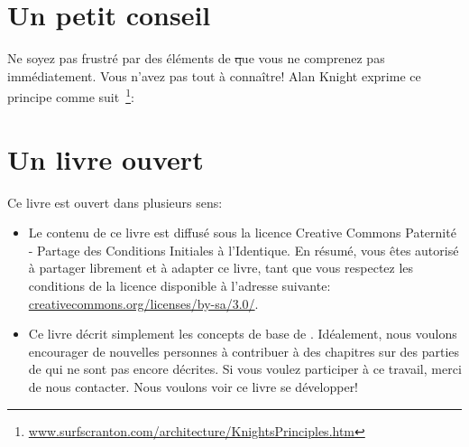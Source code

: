 \documentclass[a4paper,10pt,twoside]{book}
\begin{document}
\ifluluelse{}{\newpage} %
\section*{Un petit conseil}


Ne soyez pas frustr\'e par des \'el\'ements de \st que vous ne comprenez pas imm\'ediatement.
Vous n'avez pas tout \`a conna\^itre!
Alan Knight exprime ce principe comme suit~\footnote{\url{www.surfscranton.com/architecture/KnightsPrinciples.htm}}:
\important{{\bf Ne vous en pr\'eoccupez pas!}%
~\footnote{Dans sa version originale: ``Try not to care''.}
Les d\'eveloppeurs \st d\'ebutants ont souvent beaucoup de
difficult\'es car ils pensent qu'il est n\'ecessaire de conna\^itre
tous les d\'etails d'une chose avant de l'utiliser. Cela signifie
qu'il leur faut un moment avant de ma\^{\i}triser un simple: \ct{Transcript show: 'Hello World'}. Une des grandes avanc\'ees de la programmation par objets est de pouvoir r\'epondre \`a la question ``Comment ceci marche?'' avec  ``Je ne m'en pr\'eoccupe pas''.}

\section*{Un livre ouvert}

Ce livre est ouvert dans plusieurs sens:

\begin{itemize}

\item	Le contenu de ce livre est diffus\'e sous la licence Creative Commons Paternit\'e - Partage des Conditions Initiales \`a l'Identique.
		En r\'esum\'e, vous \^etes autoris\'e \`a partager librement et \`a adapter ce livre, tant que vous respectez les conditions de la licence disponible \`a l'adresse suivante: 
		\url{creativecommons.org/licenses/by-sa/3.0/}.

\item	Ce livre d\'ecrit simplement les concepts de base de \sq.
		Id\'ealement, nous voulons encourager de nouvelles personnes \`a contribuer \`a des chapitres sur des parties de \sq qui ne sont pas encore d\'ecrites.
		Si vous voulez participer \`a ce travail, merci de nous contacter. Nous voulons voir ce livre se d\'evelopper!
\end{itemize}
\end{document}
